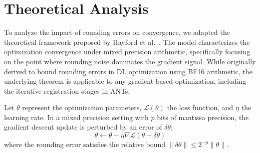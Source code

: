 \documentclass[journal,twoside,web]{ieeecolor}
\begin{document}
\section{Theoretical Analysis}
\label{sec:theory}
To analyze the impact of rounding errors on convergence, we adapted the theoretical framework proposed by Hayford et al.~\cite{Hayford2024-kb}. The model characterizes the optimization convergence under mixed precision arithmetic, specifically focusing on the point where rounding noise dominates the gradient signal. While originally derived to bound rounding errors in DL optimization using BF16 arithmetic, the underlying theorem is applicable to any gradient-based optimization, including the iterative registration stages in ANTs.

Let $\theta$ represent the optimization parameters, $\mathcal{L}(\theta)$ the loss function, and $\eta$ the learning rate. In a mixed precision setting with $p$ bits of mantissa precision, the gradient descent update is perturbed by an error of $\delta\theta$:
\begin{equation}
	\theta \leftarrow \theta - \eta \nabla\mathcal{L}(\theta + \delta\theta)
\end{equation}
where the rounding error satisfies the relative bound $\|\delta\theta\| \leq 2^{-p} \|\theta\|$.
\end{document}

